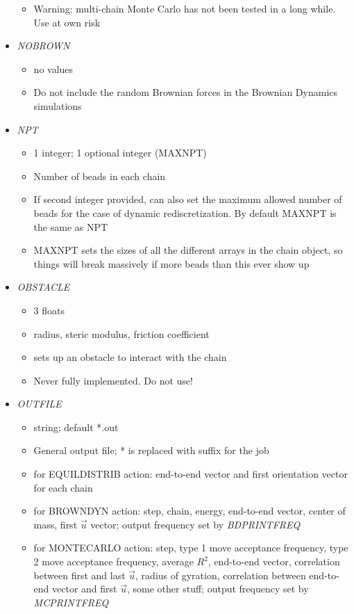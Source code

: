 \documentclass[12pt]{article}
\begin{document}
\begin{itemize}
\begin{itemize}
    \item {\color{red} Warning: multi-chain Monte Carlo has not been tested in a long while. Use at own risk}
  \end{itemize}
%
\item {\it NOBROWN}
  \begin{itemize}
    \item no values
    \item Do not include the random Brownian forces in the Brownian Dynamics simulations
  \end{itemize}
%
\item {\it NPT}
  \begin{itemize}
    \item 1 integer; 1 optional integer (MAXNPT)
    \item Number of beads in each chain
    \item If second integer provided, can also set the maximum allowed number of beads for the case of dynamic rediscretization. By default MAXNPT is the same as NPT
    \item MAXNPT sets the sizes of all the different arrays in the chain object, so things will break massively if more beads than this ever show up
  \end{itemize}
%
\item {\it OBSTACLE}
  \begin{itemize}
    \item 3 floats
    \item radius, steric modulus, friction coefficient
    \item sets up an obstacle to interact with the chain
    \item {\color{red} Never fully implemented. Do not use!}
  \end{itemize}
%
\item {\it OUTFILE}
  \begin{itemize}
    \item string; default *.out
    \item General output file; * is replaced with suffix for the job
    \item for EQUILDISTRIB action: end-to-end vector and first orientation vector for each chain
    \item for BROWNDYN action: step, chain, energy, end-to-end vector, center of mass, first $\vec{u}$ vector; output frequency set by {\em BDPRINTFREQ}
    \item for MONTECARLO action: step, type 1 move acceptance frequency, type 2 move acceptance frequency, average $R^2$, end-to-end vector, correlation between first and last $\vec{u}$, radius of gyration, correlation between end-to-end vector and first $\vec{u}$, some other stuff; output frequency set by {\em MCPRINTFREQ}    

\end{itemize}
\end{itemize}
\end{document}
